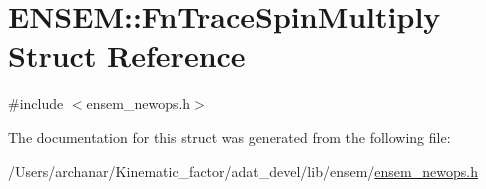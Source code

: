 \hypertarget{structENSEM_1_1FnTraceSpinMultiply}{}\section{E\+N\+S\+EM\+:\+:Fn\+Trace\+Spin\+Multiply Struct Reference}
\label{structENSEM_1_1FnTraceSpinMultiply}


{\ttfamily \#include $<$ensem\+\_\+newops.\+h$>$}



The documentation for this struct was generated from the following file\+:\begin{DoxyCompactItemize}
\item 
/\+Users/archanar/\+Kinematic\+\_\+factor/adat\+\_\+devel/lib/ensem/\mbox{\hyperlink{lib_2ensem_2ensem__newops_8h}{ensem\+\_\+newops.\+h}}\end{DoxyCompactItemize}
